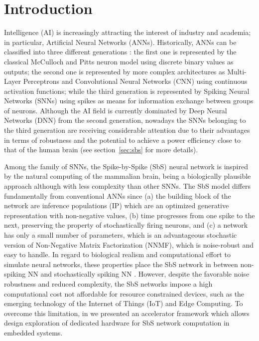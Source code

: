 
\section{Introduction}
\label{sec:introduction}
 Intelligence (AI) is increasingly attracting the interest of industry and academia; in particular,  Artificial Neural Networks (ANNs). Historically, ANNs can be classified into three different generations \cite{Design_Exploration_SbS_Trans20}: the first one is represented by the classical McCulloch and Pitts neuron model using discrete binary values as outputs; the second one is represented by more complex architectures as Multi-Layer Perceptrons and Convolutional Neural Networks (CNN) using continuous activation functions; while the third generation is represented by Spiking Neural Networks (SNNs) using spikes as means for information exchange between groups of neurons. Although the AI field is currently dominated by Deep Neural Networks (DNN) from the second generation, nowadays the SNNs belonging to the third generation are receiving considerable attention \cite{Spinnaker_Trans13,ernst2007efficient,Design_Exploration_SbS_Trans20, SNN_Survey_Trans19} due to their advantages in terms of robustness and the
potential to achieve a power efficiency close to that of the human
brain (see section~\ref{sec:sbs} for more details).

Among the family of SNNs, the Spike-by-Spike (SbS) neural network \cite{ernst2007efficient} is inspired by the natural computing of the mammalian brain, being a biologically plausible approach although with less complexity than other SNNs. The SbS model differs fundamentally from conventional ANNs since (a) the building block of the network are inference populations (IP) which are an optimized generative representation with non-negative values, (b) time progresses from one spike to the next, preserving the property of stochastically firing neurons, and (c) a network has only a small number of parameters, which is an advantageous stochastic version of Non-Negative Matrix Factorization (NNMF), which is noise-robust and easy to handle. In regard to biological realism and computational effort to simulate neural networks, these properties place the SbS network in between non-spiking NN and stochastically spiking NN \cite{rotermund2019Backpropagation}. However, despite the favorable noise robustness and reduced complexity, the SbS networks impose a high computational cost not affordable for resource constrained devices, such as the emerging technology of the Internet of Things (IoT) and Edge Computing. To overcome this limitation, in \cite{nevarez2020accelerator} we presented an accelerator framework which allows design exploration of dedicated hardware for SbS network computation in embedded systems.

